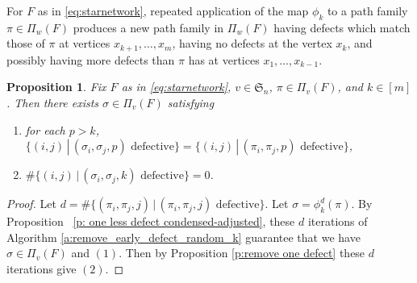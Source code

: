 \documentclass[12pt]{amsart}
\newtheorem{prop}[thm]{Proposition}
\theoremstyle{definition}
\numberwithin{equation}{section}
\newcommand{\sn}{\mathfrak{S}_n}
\begin{document}
For $F$ as in \eqref{eq:starnetwork},
repeated application of the map $\phi_k$ to a path family $\pi \in \Pi_w(F)$
produces a new path family in $\Pi_w(F)$ 
having defects which match those of $\pi$ at vertices $x_{k+1}, \dotsc, x_m$,
having no defects at the vertex $x_k$,
and possibly having more defects than $\pi$ has at vertices $x_1, \dotsc, x_{k-1}$. 
\begin{prop}\label{p: d less defects condensed}
    Fix $F$ as in \eqref{eq:starnetwork}, $v \in \sn$, $\pi \in \Pi_v(F)$, and $k \in [m]$. 
    Then there exists $\sigma \in \Pi_v(F)$ satisfying
    \begin{enumerate}
        \item for each $p > k$, $\{(i,j) \,|\, (\sigma_i, \sigma_j, p) \text{ defective}\} = \{(i,j) \,|\, (\pi_i, \pi_j, p) \text{ defective}\}$,      
        \item $\#\{(i,j) \,|\, (\sigma_i, \sigma_j, k) \text{ defective}\} = 0$.
    \end{enumerate}
\end{prop}

\begin{proof}
    Let $d = \#\{(\pi_i, \pi_j, j) \,|\, (\pi_i, \pi_j, j) \text{ defective}\}$. Let $\sigma = \phi_k^d(\pi)$. By Proposition ~\ref{p: one less defect condensed-adjusted}, these $d$ iterations of Algorithm \ref{a:remove_early_defect_random_k} guarantee that we have $\sigma \in \Pi_v(F)$ and $(1)$. Then by Proposition \ref{p:remove one defect} these $d$ iterations give $(2)$.
\end{proof}


\end{document}
